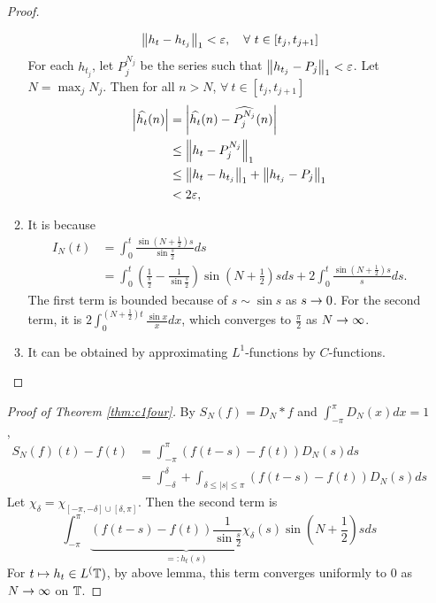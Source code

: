 \begin{enumerate}[label=\arabic*.]
\begin{proof}
\begin{enumerate}[label=\Roman{*}.]
\begin{equation*}
				\left\lVert h_t - h_{t_j}\right\lVert_1 < \varepsilon,\quad \forall~t \in [t_j,t_{j+1}]
			\end{equation*}
			For each $h_{t_j}$, let $P_j^{N_j}$ be the series such that $\left\lVert h_{t_j}-P_j\right\lVert_1 < \varepsilon$. Let $N = \max_j N_j$. Then for all $n > N$, $\forall~t \in [t_j,t_{j+1}]$
			\begin{equation*}
				\begin{aligned}
					\left\lvert\widehat{h_t}(n)\right\lvert &= \left\lvert\widehat{h_t}(n) - \widehat{P_j^{N_j}}(n)\right\lvert \\
					&\leq \left\lVert h_t - P_j^{N_j}\right\lVert_1 \\
					&\leq \left\lVert h_t - h_{t_j}\right\lVert_1+\left\lVert h_{t_j}-P_j\right\lVert_1 \\
					&< 2\varepsilon,
				\end{aligned}
			\end{equation*}

			\item It is because
			\begin{equation*}
				\begin{aligned}
					I_N(t) & =\int_0^t \frac{\sin \left(N+\frac{1}{2}\right) s}{\sin \frac{s}{2}} d s \\
					& =\int_0^t\left(\frac{1}{\frac{s}{2}}-\frac{1}{\sin \frac{s}{2}}\right) \sin \left(N+\frac{1}{2}\right) s d s+2 \int_0^t \frac{\sin \left(N+\frac{1}{2}\right) s}{s} d s .
				\end{aligned}
			\end{equation*}
			The first term is bounded because of $s \sim \sin s$ as $s \rightarrow 0$. For the second term, it is $2 \int_0^{\left(N+\frac{1}{2}\right) t} \frac{\sin x}{x} d x$, which converges to $\frac{\pi}{2}$ as $N \rightarrow \infty$.

			\item It can be obtained by approximating $L^1$-functions by $C$-functions.
		\end{enumerate}
	\end{proof}

	\begin{proof}[Proof of Theorem \ref{thm:c1four}]
		By $S_N(f) = D_N * f$ and $\int_{-\pi}^\pi D_N(x)dx = 1$, 
		\begin{equation*}
			\begin{aligned}
				S_N(f)(t)-f(t) & =\int_{-\pi}^\pi(f(t-s)-f(t)) D_N(s) d s \\
				& =\int_{-\delta}^\delta+\int_{\delta \leq|s| \leq \pi}(f(t-s)-f(t)) D_N(s) d s
			\end{aligned}
		\end{equation*}
		Let $\chi_\delta = \chi_{[-\pi,-\delta] \cup[\delta, \pi]}$. Then the second term is
		\begin{equation*}
			\int_{-\pi}^\pi \underbrace{(f(t-s)-f(t)) \frac{1}{\sin \frac{s}{2}} \chi_\delta(s)}_{=: h_t(s)} \sin \left(N+\frac{1}{2}\right) s d s 
		\end{equation*}
		For $t \mapsto h_t \in L^(\mathbb{T})$, by above lemma, this term converges uniformly to $0$ as $N \rightarrow \infty$ on $\mathbb{T}$.


\end{proof}
\end{enumerate}
